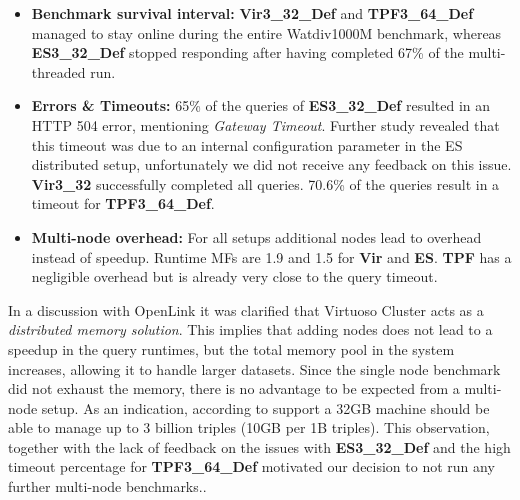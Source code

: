 \documentclass[twocolumn]{bmcart}%
\begin{document}
\begin{itemize}
	\item \textbf{Benchmark survival interval:} %
	\textbf{Vir3\_32\_Def} and \textbf{TPF3\_64\_Def} managed to stay online during the entire Watdiv1000M benchmark, whereas \textbf{ES3\_32\_Def} stopped responding after having completed 67\% of the multi-threaded run. 
	\item \textbf{Errors \& Timeouts:} 65\% of the queries of \textbf{ES3\_32\_Def} resulted in an HTTP 504 error, mentioning \textit{Gateway Timeout}. Further study revealed that this timeout was due to an internal configuration parameter in the ES distributed setup, unfortunately we did not receive any feedback on this issue. \textbf{Vir3\_32} successfully completed all queries. 70.6\% of the queries result in a timeout for \textbf{TPF3\_64\_Def}.
	\item \textbf{Multi-node overhead:} For all setups additional nodes lead to overhead instead of speedup. Runtime MFs are 1.9 and 1.5 for \textbf{Vir} and \textbf{ES}. \textbf{TPF} has a negligible overhead but is already very close to the query timeout.
\end{itemize}
%
%   

In a discussion with OpenLink it was clarified that Virtuoso Cluster acts as a \emph{distributed memory solution}. This implies that adding nodes does not lead to a speedup in the query runtimes, but the total memory pool in the system increases, allowing it to handle larger datasets. Since the single node benchmark did not exhaust the memory, there is no advantage to be expected from a multi-node setup. As an indication, according to support a 32GB machine should be able to manage up to 3 billion triples (10GB per 1B triples). 
This observation, together with the lack of feedback on the issues with \textbf{ES3\_32\_Def} and the high timeout percentage for \textbf{TPF3\_64\_Def} motivated our decision to not run any further multi-node benchmarks..
\end{document}
